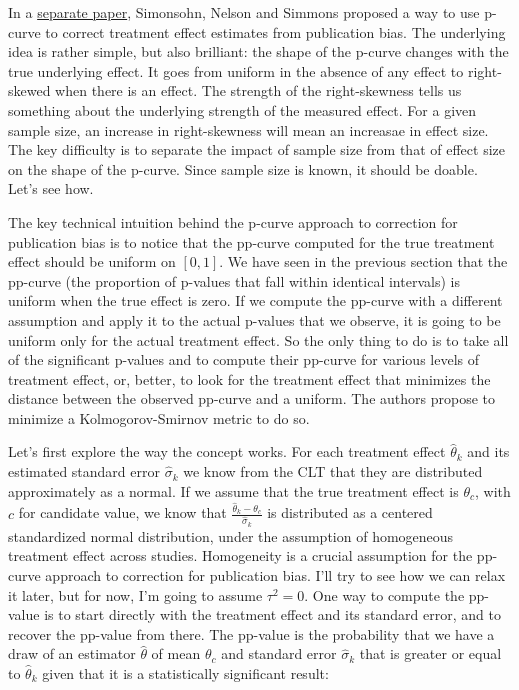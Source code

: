 \documentclass[]{book}
\theoremstyle{definition}
\theoremstyle{definition}
\theoremstyle{definition}
\theoremstyle{remark}
\begin{document}
In a \href{https://poseidon01.ssrn.com/delivery.php?ID=968120070017096022067095015077090081127015066012065038099103064095066125118101087000019101125033110002058114102117068031082117013010054030001011069073086069105087004037003126007029115080118115116004080116094099076097092111007065003101127024028025084\&EXT=pdf}{separate paper}, Simonsohn, Nelson and Simmons proposed a way to use p-curve to correct treatment effect estimates from publication bias.
The underlying idea is rather simple, but also brilliant: the shape of the p-curve changes with the true underlying effect.
It goes from uniform in the absence of any effect to right-skewed when there is an effect.
The strength of the right-skewness tells us something about the underlying strength of the measured effect.
For a given sample size, an increase in right-skewness will mean an increasae in effect size.
The key difficulty is to separate the impact of sample size from that of effect size on the shape of the p-curve.
Since sample size is known, it should be doable.
Let's see how.

The key technical intuition behind the p-curve approach to correction for publication bias is to notice that the pp-curve computed for the true treatment effect should be uniform on \(\left[0,1\right]\).
We have seen in the previous section that the pp-curve (the proportion of p-values that fall within identical intervals) is uniform when the true effect is zero.
If we compute the pp-curve with a different assumption and apply it to the actual p-values that we observe, it is going to be uniform only for the actual treatment effect.
So the only thing to do is to take all of the significant p-values and to compute their pp-curve for various levels of treatment effect, or, better, to look for the treatment effect that minimizes the distance between the observed pp-curve and a uniform.
The authors propose to minimize a Kolmogorov-Smirnov metric to do so.

Let's first explore the way the concept works.
For each treatment effect \(\hat{\theta}_k\) and its estimated standard error \(\hat{\sigma}_k\) we know from the CLT that they are distributed approximately as a normal.
If we assume that the true treatment effect is \(\theta_c\), with \(c\) for candidate value, we know that \(\frac{\hat{\theta}_k-\theta_c}{\hat{\sigma}_k}\) is distributed as a centered standardized normal distribution, under the assumption of homogeneous treatment effect across studies.
Homogeneity is a crucial assumption for the pp-curve approach to correction for publication bias.
I'll try to see how we can relax it later, but for now, I'm going to assume \(\tau^2=0\).
One way to compute the pp-value is to start directly with the treatment effect and its standard error, and to recover the pp-value from there.
The pp-value is the probability that we have a draw of an estimator \(\hat{\theta}\) of mean \(\theta_c\) and standard error \(\hat{\sigma}_k\) that is greater or equal to \(\hat{\theta}_k\) given that it is a statistically significant result:
\end{document}
